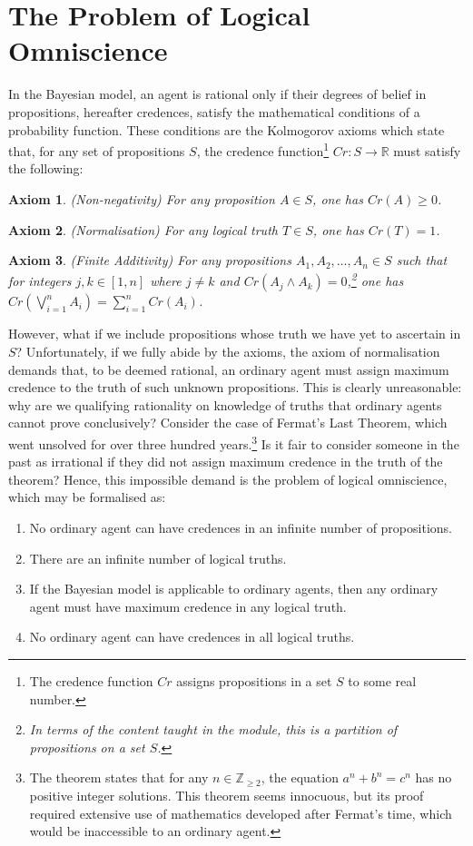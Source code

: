 \documentclass[12pt]{article}
\newtheorem{axiom}{Axiom}
\begin{document}
\section{The Problem of Logical Omniscience}
In the Bayesian model, an agent is rational only if their degrees of belief in propositions, hereafter credences, satisfy the mathematical conditions of a probability function.\autocite[13]{bdrc} These conditions are the Kolmogorov axioms which state that, for any set of propositions $S$, the credence function\footnote{The credence function $Cr$ assigns propositions in a set $S$ to some real number.} $Cr:S\rightarrow\mathbb{R}$ must satisfy the following:
\begin{axiom}
    (Non-negativity) For any proposition $A\in S$, one has $Cr(A)\geq0$.
\end{axiom}
\begin{axiom}
    (Normalisation) For any logical truth $T\in S$, one has $Cr(T)=1$.
\end{axiom}
\begin{axiom}
    (Finite Additivity) For any propositions $A_1, A_2,\dots, A_n\in S$ such that for integers $j,k\in[1,n]$ where $j\neq k$ and $Cr(A_j\land A_k)=0$,\footnote{In terms of the content taught in the module, this is a partition of propositions on a set $S$.} one has $Cr(\bigvee_{i=1}^{n}A_i)=\sum_{i=1}^{n}Cr(A_i)$.
\end{axiom}
However, what if we include propositions whose truth we have yet to ascertain in $S$? Unfortunately, if we fully abide by the axioms, the axiom of normalisation demands that, to be deemed rational, an ordinary agent must assign maximum credence to the truth of such unknown propositions. This is clearly unreasonable: why are we qualifying rationality on knowledge of truths that ordinary agents cannot prove conclusively? Consider the case of Fermat's Last Theorem, which went unsolved for over three hundred years.\footnote{The theorem states that for any $n\in\mathbb{Z}_{\geq2}$, the equation $a^n+b^n=c^n$ has no positive integer solutions. This theorem seems innocuous, but its proof required extensive use of mathematics developed after Fermat's time, which would be inaccessible to an ordinary agent.} Is it fair to consider someone in the past as irrational if they did not assign maximum credence in the truth of the theorem?\autocite[108]{dogramaci} Hence, this impossible demand is the problem of logical omniscience, which may be formalised as:\autocite{youtube}
\begin{enumerate}[label=\textbf{P\arabic*:},leftmargin=0.5in]
    \item No ordinary agent can have credences in an infinite number of propositions.
    \item There are an infinite number of logical truths.
    \item If the Bayesian model is applicable to ordinary agents, then any ordinary agent must have maximum credence in any logical truth.
    \item No ordinary agent can have credences in all logical truths.
\end{enumerate}
\end{document}
